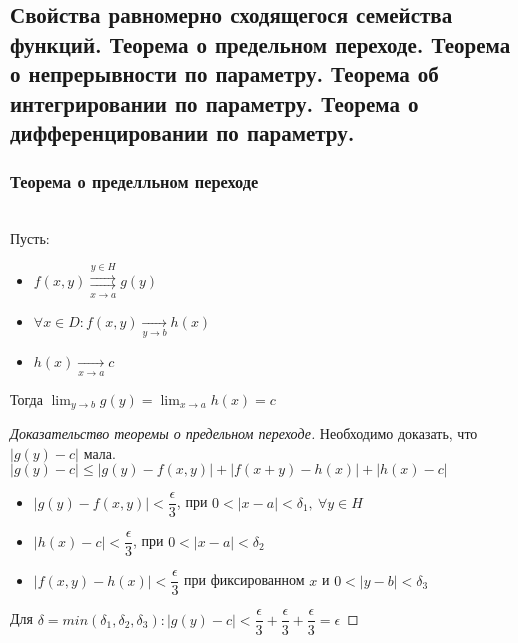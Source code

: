 \subsection{Свойства равномерно сходящегося семейства функций. Теорема о предельном переходе. Теорема о непрерывности по параметру. Теорема об интегрировании по параметру. Теорема о дифференцировании по параметру.}

\subsubsection{Теорема о пределльном переходе}

\begin{theorem*} \ \\
    Пусть: 
    \begin{itemize}
        \item $f(x, y) \overset{y \in H}{\underset{x \to a}{\rightrightarrows}} g(y)$
        \item $\forall x \in D: f(x, y) \underset{y \to b}{\to} h(x)$
        \item $h(x) \underset{x \to a}{\to} c$
    \end{itemize}  
    Тогда $\displaystyle \lim_{y \to b} g(y) = \lim_{x \to a} h(x) = c$
\end{theorem*}
\begin{proof}[Доказательство теоремы о предельном переходе]
    Необходимо доказать, что $|g(y) - c|$ мала. \\
    $|g(y) - c| \leqslant |g(y) - f(x, y)| + |f(x + y) - h(x)| + |h(x) - c|$ \\
    \begin{itemize}
        \item $|g(y) - f(x, y)| < \dfrac{\epsilon}{3}$, при $ 0 < |x - a| < \delta_1, \ \forall y \in H$
        \item $|h(x) - c| < \dfrac{\epsilon}{3}$, при $0 < |x - a| < \delta_2$
        \item $|f(x, y) - h(x)| < \dfrac{\epsilon}{3}$ при фиксированном
         $x$ и  $0 < |y - b| < \delta_3$
    \end{itemize}  
    Для $\delta = min(\delta_1, \delta_2, \delta_3): |g(y) - c| < \dfrac{\epsilon}{3} + 
    \dfrac{\epsilon}{3} +  \dfrac{\epsilon}{3} = \epsilon$
\end{proof}
